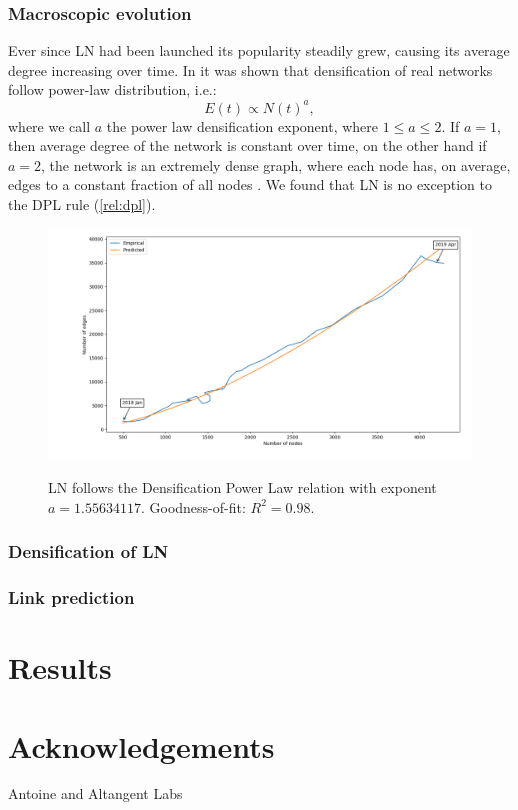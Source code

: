 \documentclass[a4paper]{article}
\theoremstyle{definition}
\begin{document}
\subsubsection{Macroscopic evolution}
Ever since LN had been launched its popularity steadily grew, causing its average degree increasing over time. In \cite{leskovec2008dynamics} it was shown that densification of real networks follow power-law distribution, i.e.: 
\begin{equation}
	E(t) \propto N(t)^{a},
\end{equation} \label{rel:dpl}
where we call $a$ the power law densification exponent, where  $1\leq a \leq 2$. If $a=1$, then average degree of the network is constant over time, on the other hand if $a=2$, the network is an extremely dense graph, where each node has, on average, edges to a constant fraction of all nodes \cite{leskovec2008dynamics}. We found that LN is no exception to the DPL rule (\ref{rel:dpl}).

\begin{figure}[H]
	\includegraphics[width=\textwidth]{densificationPowerLaw.png}
	\label{fig:densification}
	\caption{LN follows the Densification Power Law relation with exponent $a=1.55634117$. Goodness-of-fit: $R^2=0.98$.  }
\end{figure}

\subsubsection{Densification of LN}
\subsubsection{Link prediction}
\section{Results}
\section{Acknowledgements}
Antoine and Altangent Labs



\end{document}
